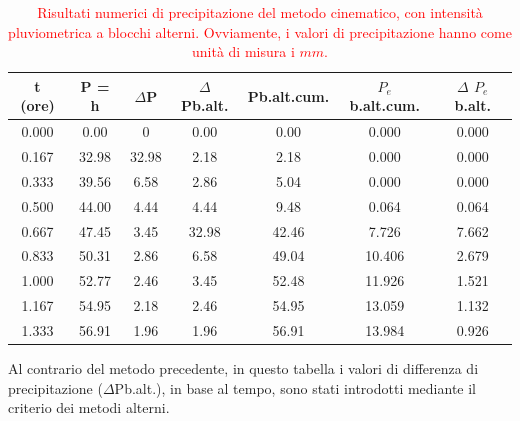 \begin{table}[H] \centering
    \caption{\textcolor{red}{Risultati numerici di precipitazione del metodo cinematico, con intensità pluviometrica a blocchi alterni. Ovviamente, i valori di precipitazione hanno come unità di misura i $mm$.}}
    \begin{tabular}{ccccccc}
        \toprule
    t (ore) & P = h & $\Delta$P & $\Delta$Pb.alt. & Pb.alt.cum. & $P_e$b.alt.cum.  & $\Delta$ $P_e$b.alt. \\
    \midrule
     0.000   & 0.00                 & 0                    & 0.00              & 0.00                & 0.000                & 0.000              \\
     0.167   & 32.98                & 32.98                & 2.18              & 2.18                & 0.000                & 0.000              \\
     0.333   & 39.56                & 6.58                 & 2.86              & 5.04                & 0.000                & 0.000              \\
     0.500   & 44.00                & 4.44                 & 4.44              & 9.48                & 0.064                & 0.064              \\
    0.667   & 47.45                & 3.45                 & 32.98             & 42.46               & 7.726                & 7.662              \\
    0.833   & 50.31                & 2.86                 & 6.58              & 49.04               & 10.406               & 2.679              \\
    1.000   & 52.77                & 2.46                 & 3.45              & 52.48               & 11.926               & 1.521              \\
    1.167   & 54.95                & 2.18                 & 2.46              & 54.95               & 13.059               & 1.132              \\
    1.333   & 56.91                & 1.96                 & 1.96              & 56.91               & 13.984               & 0.926             \\
    \bottomrule
    \end{tabular}
    \end{table}
Al contrario del metodo precedente, in questo tabella i valori di differenza di precipitazione ($\Delta$Pb.alt.), in base al tempo, sono stati introdotti mediante il criterio dei metodi alterni.\\

